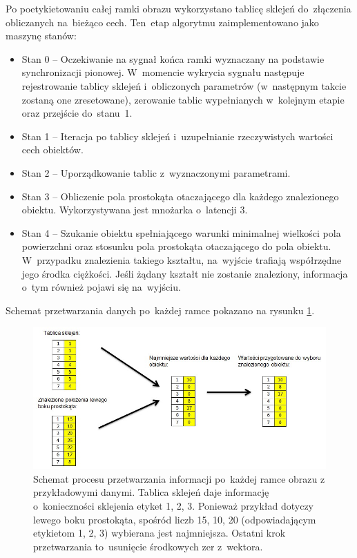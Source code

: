 Po poetykietowaniu całej ramki obrazu wykorzystano tablicę sklejeń do~złączenia obliczanych na~bieżąco cech. 
Ten~etap algorytmu zaimplementowano jako maszynę stanów:
\begin{itemize}
	\item Stan 0 -- Oczekiwanie na sygnał końca ramki wyznaczany na podstawie synchronizacji pionowej. W~momencie wykrycia sygnału następuje rejestrowanie tablicy sklejeń i~obliczonych parametrów (w~następnym takcie zostaną one zresetowane), zerowanie tablic wypełnianych w~kolejnym etapie oraz przejście do~stanu~1. %
	\item Stan 1 -- Iteracja po tablicy sklejeń i~uzupełnianie rzeczywistych wartości cech obiektów.
	\item Stan 2 -- Uporządkowanie tablic z~wyznaczonymi parametrami.
	\item Stan 3 -- Obliczenie pola prostokąta otaczającego dla każdego znalezionego obiektu. Wykorzystywana jest mnożarka o~latencji 3.
	\item Stan 4 -- Szukanie obiektu spełniającego warunki minimalnej wielkości pola powierzchni oraz stosunku pola prostokąta otaczającego do pola obiektu. W~przypadku znalezienia takiego kształtu, na~wyjście trafiają współrzędne jego środka ciężkości. Jeśli żądany kształt nie zostanie znaleziony, informacja o~tym również pojawi się na~wyjściu.
\end{itemize}
Schemat przetwarzania danych po~każdej ramce pokazano na rysunku \ref{fig:ind_schemat}.
\begin{figure}[h]
	\centering
	\includegraphics[width=\textwidth]{ind_schemat.jpg}
	\caption{Schemat procesu przetwarzania informacji po~każdej ramce obrazu z przykładowymi danymi. Tablica sklejeń daje informację o~konieczności sklejenia etyket 1, 2, 3. Ponieważ przykład dotyczy lewego boku prostokąta, spośród liczb 15, 10, 20 (odpowiadającym etykietom 1, 2, 3) wybierana jest najmniejsza. Ostatni krok przetwarzania to~usunięcie środkowych zer z~wektora.}
	\label{fig:ind_schemat}
\end{figure}

